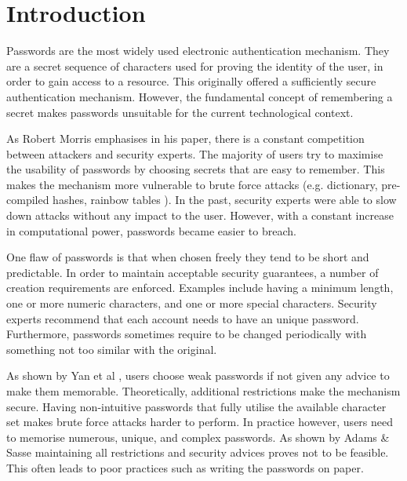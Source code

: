 
\chapter{Introduction} %

\label{Chapter1}


Passwords are the most widely used electronic authentication mechanism. They are a secret sequence of characters used for proving the identity of the user, in order to gain access to a resource. This originally offered a sufficiently secure authentication mechanism. However, the fundamental concept of remembering a secret makes passwords unsuitable for the current technological context. 

As Robert Morris \cite{morris1979password} emphasises in his paper, there is a constant competition between attackers and security experts. The majority of users try to maximise the usability of passwords by choosing secrets that are easy to remember. This makes the mechanism more vulnerable to brute force attacks (e.g. dictionary, pre-compiled hashes, rainbow tables \cite{oechslin2003making}). In the past, security experts were able to slow down attacks without any impact to the user. However, with a constant increase in computational power, passwords became easier to breach. 

One flaw of passwords is that when chosen freely they tend to be short and predictable. In order to maintain acceptable security guarantees, a number of creation requirements are enforced. Examples include having a minimum length, one or more numeric characters, and one or more special characters. Security experts recommend that each account needs to have an unique password. Furthermore, passwords sometimes require to be changed periodically with something not too similar with the original. 

As shown by Yan et al \cite{yan2004password}, users choose weak passwords if not given any advice to make them memorable. Theoretically, additional restrictions make the mechanism secure. Having non-intuitive passwords that fully utilise the available character set makes brute force attacks harder to perform. In practice however, users need to memorise numerous, unique, and complex passwords. As shown by Adams \& Sasse \cite{adams1999users} maintaining all restrictions and security advices proves not to be feasible. This often leads to poor practices such as writing the passwords on paper.

